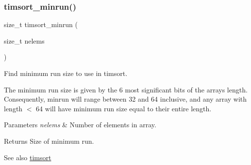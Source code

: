 \subsubsection{\texorpdfstring{timsort\+\_\+minrun()}{timsort\_minrun()}}
{\footnotesize\ttfamily size\+\_\+t timsort\+\_\+minrun (\begin{DoxyParamCaption}\item[{size\+\_\+t}]{nelems }\end{DoxyParamCaption})}



Find minimum run size to use in timsort. 

The minimum run size is given by the 6 most significant bits of the array\textquotesingle{}s length. Consequently, minrun will range between 32 and 64 inclusive, and any array with length $<$ 64 will have minimum run size equal to their entire length.


\begin{DoxyParams}{Parameters}
{\em nelems} & Number of elements in array. \\
\hline
\end{DoxyParams}
\begin{DoxyReturn}{Returns}
Size of minimum run.
\end{DoxyReturn}
\begin{DoxySeeAlso}{See also}
\hyperlink{group__Timsort_ga1c9fca70060e37617156b89b387aa4d3}{timsort} 
\end{DoxySeeAlso}
